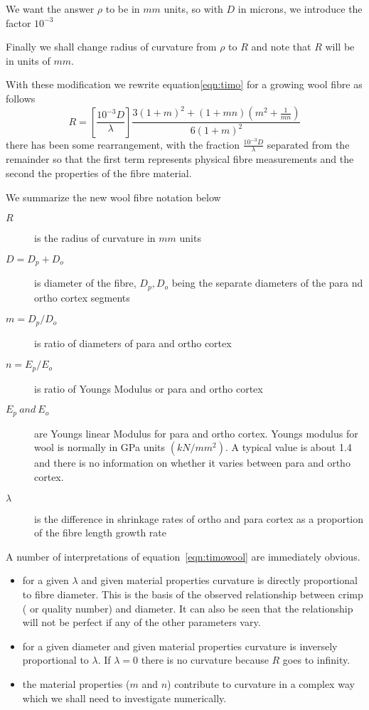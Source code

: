 \documentclass[titlepage]{article}  %
\begin{document}
We want the answer $\rho$ to be in $mm$ units, so with $D$ in microns, we introduce the factor $10^{-3}$

Finally we shall change radius of curvature from $\rho$ to $R$ and note that $R$ will be in units of $mm$.

With these modification we rewrite equation\ref{eqn:timo} for a growing wool fibre as follows
\begin{equation}
\label{eqn:timowool}
R = \left[ \frac{10^{-3}D}{\lambda} \right] \frac{ 3(1+m)^{2}+(1+mn)(m^{2}+\frac{1}{mn})} {6(1+m)^{2}}
\end{equation}
there has been some rearrangement, with the fraction $\frac{10^{-3}D}{\lambda}$ separated from the remainder so that the first term represents physical fibre measurements and the second the properties of the fibre material.

We summarize the new wool fibre notation below
\begin{description}
\item[$R$] is the radius of curvature in $mm$ units
\item[$D = D_{p} + D_{o}$] is diameter of the fibre, $D_{p},D_{o}$ being the separate diameters of the para nd ortho cortex segments
\item[$m = D_{p}/D_{o}$] is ratio of diameters of para and ortho cortex
\item[$n = E_{p}/E_{o}$] is ratio of Youngs Modulus or para and ortho cortex
\item[$E_{p}\: and\: E_{o}$]are Youngs linear Modulus for para and ortho cortex. Youngs modulus for wool is normally in GPa units $(kN/mm^{2})$. A typical value is about 1.4 and there is no information on whether it varies between para and ortho cortex.
\item[$\lambda$] is the difference in shrinkage rates of ortho and para cortex as a proportion of the fibre length growth rate
\end{description}

A number of interpretations of equation~\ref{eqn:timowool} are immediately obvious.
\begin{itemize}
\item for a given $\lambda$ and given material properties curvature is directly proportional to fibre diameter. This is the basis of the observed relationship between crimp ( or quality number) and diameter. It can also be seen that the relationship will not be perfect if any of the other parameters vary.
\item for a given diameter and given material properties curvature is inversely proportional to $\lambda$. If $\lambda = 0$  there is no curvature because $R$ goes to infinity.
\item the material properties ($m$ and $n$) contribute to curvature in a complex way which we shall need to investigate numerically.
\end{itemize}
\end{document}
